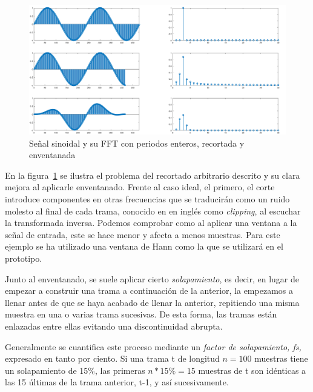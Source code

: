 \begin{figure}[!ht]
\begin{center}
\includegraphics[width=14cm]{img/problem_fft.png}
\caption{\label{fig:probfft}Señal sinoidal y su FFT con periodos enteros, recortada y enventanada}
\end{center}
\end{figure}

En la figura~\ref{fig:probfft} se ilustra el problema del recortado arbitrario descrito y su clara mejora al aplicarle enventanado. Frente al caso ideal, el primero, el corte introduce componentes en otras frecuencias que se traducirán como un ruido molesto al final de cada trama, conocido en en inglés como \emph{clipping}, al escuchar la transformada inversa. Podemos comprobar como al aplicar una ventana a la señal de entrada, este se hace menor y afecta a menos muestras. Para este ejemplo se ha utilizado una ventana de Hann como la que se utilizará en el prototipo.

Junto al enventanado, se suele aplicar cierto \emph{solapamiento}, es decir, en lugar de empezar a construir una trama a continuación de la anterior, la empezamos a llenar antes de que se haya acabado de llenar la anterior, repitiendo una misma muestra en una o varias trama sucesivas. De esta forma, las tramas están enlazadas entre ellas evitando una discontinuidad abrupta.

Generalmente se cuantifica este proceso mediante un \emph{factor de solapamiento, fs,} expresado en tanto por ciento. Si una trama t de longitud $n = 100$ muestras tiene un solapamiento de 15\%, las primeras $n*15\% = 15$ muestras de t son idénticas a las 15 últimas de la trama anterior, t-1, y así sucesivamente.

